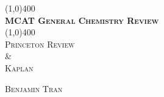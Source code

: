 \documentclass[10pt,a4paper]{report}
\begin{document}
\begin{titlepage}
	\begin{center}
		\line(1,0){400}\\
		[0.25in]
		\huge{\bfseries \textsc{MCAT General Chemistry Review}}\\
		[0.10in]
		\line(1,0){400}\\
		\textsc{Princeton Review}\\
		\& \\
		\textsc{Kaplan\textdagger}\\
		[10cm]
	\end{center}
	
	\begin{flushright}
		\textsc{Benjamin Tran}
	\end{flushright}
\end{titlepage}
	
	
	\tableofcontents
	\thispagestyle{empty}
	\cleardoublepage
	\setcounter{page}{1}
	\setcounter{chapter}{2}

	
	
	
	
	
	
	
	
\end{document}

